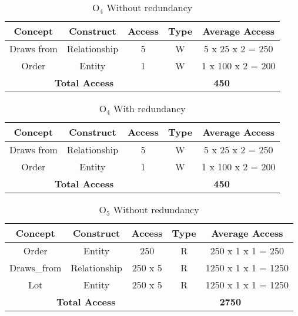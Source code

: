 \begin{table}[!h]\caption{	$ \textrm{O}_\textrm{4} $ Without redundancy }
	\begin{center}
		\begin{tabular}{| c | c | c | c | c |}
			\hline
			\textbf{Concept} & \textbf{Construct} & \textbf{Access} & \textbf{Type} & \textbf{Average Access} \\ \hline
			Draws from & Relationship & 5 & W & 5 x 25 x 2 = 250 \\ \hline
			Order & Entity & 1 & W & 1 x 100 x 2 = 200 \\ \hline
			\multicolumn{3}{|c|}{\textbf{Total Access}} & \multicolumn{2}{|c|}{\textbf{450}} \\ \hline
		\end{tabular}
	\end{center}
\end{table}
\begin{table}[!h]\caption{	$ \textrm{O}_\textrm{4} $ With redundancy }
	\begin{center}
		\begin{tabular}{| c | c | c | c | c |}
			\hline
			\textbf{Concept} & \textbf{Construct} & \textbf{Access} & \textbf{Type} & \textbf{Average Access} \\ \hline
			Draws from & Relationship & 5 & W & 5 x 25 x 2 = 250 \\ \hline
			Order & Entity & 1 & W & 1 x 100 x 2 = 200 \\ \hline
			\multicolumn{3}{|c|}{\textbf{Total Access}} & \multicolumn{2}{|c|}{\textbf{450}} \\ \hline
		\end{tabular}
	\end{center}
\end{table}
\begin{table}[!h]\caption{	$ \textrm{O}_\textrm{5} $ Without redundancy }
	\begin{center}
		\begin{tabular}{| c | c | c | c | c |}
			\hline
			\textbf{Concept} & \textbf{Construct} & \textbf{Access} & \textbf{Type} & \textbf{Average Access} \\ \hline
			Order & Entity & 250 & R & 250 x 1 x 1 = 250 \\ \hline
			Draws\_from & Relationship & 250 x 5 & R & 1250 x 1 x 1 = 1250 \\ \hline
			Lot & Entity &  250 x 5 & R & 1250 x 1 x 1 = 1250 \\ \hline
			\multicolumn{3}{|c|}{\textbf{Total Access}} & \multicolumn{2}{|c|}{\textbf{2750}} \\ \hline
		\end{tabular}
	\end{center}
\end{table}
